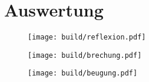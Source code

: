 \section{Auswertung}
\label{sec:auswertung}

\begin{figure}[H]
	\texttt{[image: build/reflexion.pdf]}
	\caption{}
	\label{fig:reflexion}
\end{figure}

\begin{figure}[H]
	\texttt{[image: build/brechung.pdf]}
	\caption{}
	\label{fig:brechung}
\end{figure}

\begin{figure}[H]
	\texttt{[image: build/beugung.pdf]}
	\caption{}
	\label{fig:beugung}
\end{figure}
